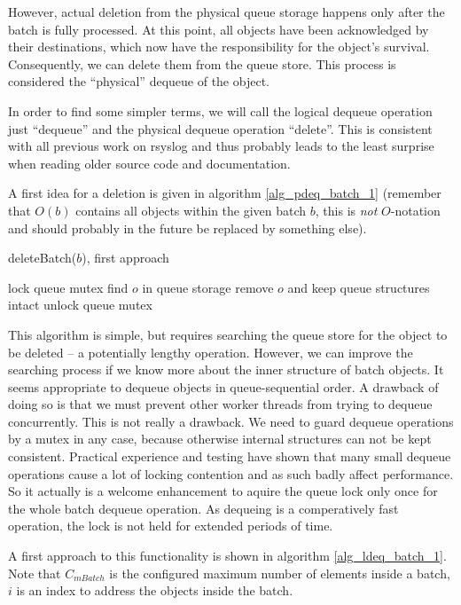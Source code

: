 \documentclass[a4paper,10pt]{article}
\begin{document}
However, actual deletion from the physical queue storage happens only after the batch is fully processed. At this point, all objects have been acknowledged by their destinations, which now have the responsibility for the object's survival. Consequently, we can delete them from the queue store. This process is considered the ``physical'' dequeue of the object.

In order to find some simpler terms, we will call the logical dequeue operation just ``dequeue'' and the physical dequeue operation ``delete''. This is consistent with all previous work on rsyslog and thus probably leads to the least surprise when reading older source code and documentation.

A first idea for a deletion is given in algorithm \ref{alg_pdeq_batch_1} (remember that $O(b)$ contains all objects within the given batch $b$, this is \emph{not} $O$-notation and should probably in the future be replaced by something else).

\begin{algorithm}
\caption{deleteBatch($b$), first approach}
\begin{algorithmic}
\label{alg_pdeq_batch_1}
\STATE lock queue mutex
	\STATE find $o$ in queue storage
	\STATE remove $o$ and keep queue structures intact
\ENDFOR
\STATE unlock queue mutex
\end{algorithmic}
\end{algorithm}

This algorithm is simple, but requires searching the queue store for the object to be deleted -- a potentially lengthy operation. However, we can improve the searching process if we know more about the inner structure of batch objects. It seems appropriate to dequeue objects in queue-sequential order. A drawback of doing so is that we must prevent other worker threads from trying to dequeue concurrently. This is not really a drawback. We need to guard dequeue operations by a mutex in any case, because otherwise internal structures can not be kept consistent. Practical experience and testing have shown that many small dequeue operations cause a lot of locking contention and as such badly affect performance. So it actually is a welcome enhancement to aquire the queue lock only once for the whole batch dequeue operation. As dequeing is a comperatively fast operation, the lock is not held for extended periods of time.

A first approach to this functionality is shown in algorithm \ref{alg_ldeq_batch_1}. Note that $C_{mBatch}$ is the configured maximum number of elements inside a batch, $i$ is an index to address the objects inside the batch.
\end{document}

